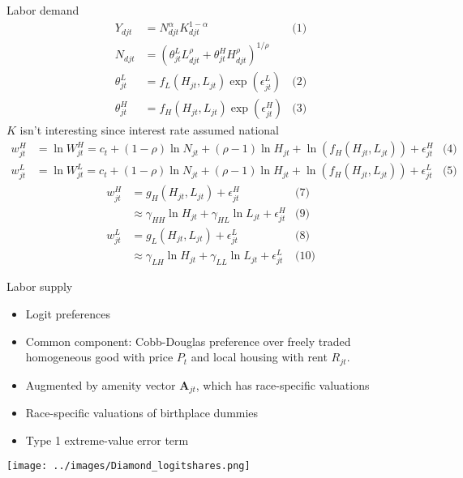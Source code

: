 \documentclass[10pt,notes=hide]{beamer}
\begin{document}
\begin{frame}{Labor demand}
\begin{align*}
Y_{djt} &= N^{\alpha}_{djt} K^{1-\alpha}_{djt}
&\text{(1)} \\
N_{djt} &= \left(\theta^{L}_{jt} L^{\rho}_{djt} + \theta^{H}_{jt} H^{\rho}_{djt}\right)^{1/{\rho}} \\
\theta^{L}_{jt} &= f_L \left(H_{jt}, L_{jt}\right) \exp(\epsilon_{jt}^{L})
&\text{(2)} \\
\theta^{H}_{jt} &= f_H \left(H_{jt}, L_{jt}\right) \exp(\epsilon_{jt}^{H})
&\text{(3)}
\end{align*}
$K$ isn't interesting since interest rate assumed national
\begin{align*}
w_{jt}^{H} &= \ln W_{jt}^{H} = c_{t} + (1-\rho) \ln N_{jt} + (\rho-1) \ln H_{jt} + \ln \left(f_H(H_{jt},L_{jt})\right) + \epsilon_{jt}^{H}
&\text{(4)} \\
w_{jt}^{L} &= \ln W_{jt}^{L} = c_{t} + (1-\rho) \ln N_{jt} + (\rho-1) \ln H_{jt} + \ln \left(f_H(H_{jt},L_{jt})\right) + \epsilon_{jt}^{L}
&\text{(5)} %
\end{align*}
\begin{align*}
w_{jt}^{H} &= g_{H} \left(H_{jt},L_{jt}\right) + \epsilon_{jt}^{H}
&\text{(7)} \\
&\approx \gamma_{HH} \ln H_{jt} + \gamma_{HL} \ln L_{jt} + \epsilon_{jt}^{H}
&\text{(9)} \\
w_{jt}^{L} &= g_{L} \left(H_{jt},L_{jt}\right) + \epsilon_{jt}^{L}
&\text{(8)} \\
&\approx \gamma_{LH} \ln H_{jt} + \gamma_{LL} \ln L_{jt} + \epsilon_{jt}^{L}
&\text{(10)} %
\end{align*}
\end{frame}
\begin{frame}{Labor supply}
\begin{itemize}
	\item Logit preferences
	\item Common component: Cobb-Douglas preference over freely traded homogeneous good with price $P_t$ and local housing with rent $R_{jt}$.
	\item Augmented by amenity vector $\mathbf{A}_{jt}$, which has race-specific valuations
	\item Race-specific valuations of birthplace dummies
	\item Type 1 extreme-value error term
\end{itemize}
\begin{center}
\texttt{[image: ../images/Diamond\_logitshares.png]}
\end{center}
\end{frame}
\end{document}
